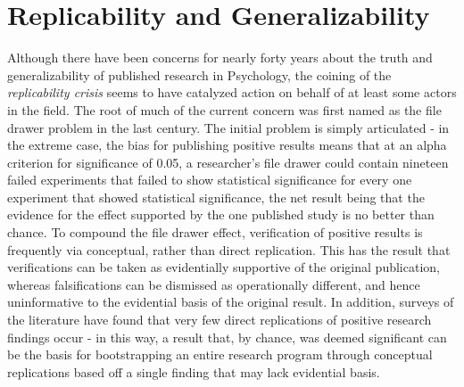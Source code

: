 \documentclass[12pt,a4paper,titlepage]{scrreprt}
\begin{document}
\section{Replicability and Generalizability}
Although there have been concerns for nearly forty years\cite{greenwald_consequences_1975} about the truth and generalizability of published research in Psychology, the coining of the \textit{replicability crisis}\cite{pashler_editors_2012} seems to have catalyzed action on behalf of at least some actors in the field. The root of much of the current concern was first named as the file drawer problem in the last century\cite{rosenthal_file_1979}. The initial problem is simply articulated - in the extreme case, the bias for publishing positive results means that at an alpha criterion for significance of 0.05, a researcher's file drawer could contain nineteen failed experiments that failed to show statistical significance for every one experiment that showed statistical significance, the net result being that the evidence for the effect supported by the one published study is no better than chance.
To compound the file drawer effect, verification of positive results is frequently via conceptual, rather than direct replication\cite{pashler_is_2012}. This has the result that verifications can be taken as evidentially supportive of the original publication, whereas falsifications can be dismissed as operationally different, and hence uninformative to the evidential basis of the original result. In addition, surveys of the literature have found that very few direct replications of positive research findings occur\cite{makel_replications_2012} - in this way, a result that, by chance, was deemed significant can be the basis for bootstrapping an entire research program through conceptual replications based off a single finding that may lack evidential basis.
\end{document}

